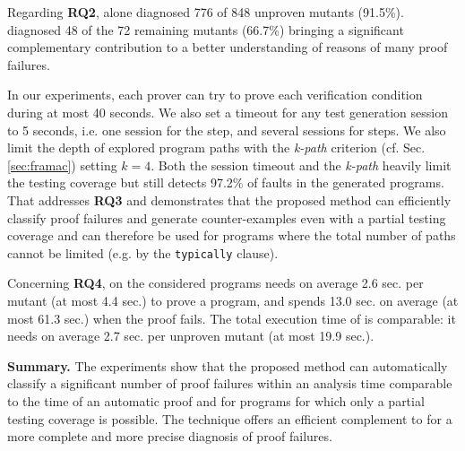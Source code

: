 Regarding \textbf{RQ2}, 
\NCD alone diagnosed 776 of 848 unproven mutants (91.5\%).
\CWD diagnosed 48 of the 72 remaining  mutants (66.7\%)
bringing a significant complementary contribution 
to a better understanding of reasons of many proof failures.

In our experiments,
each prover can try to prove each verification condition 
during at most 40 seconds.
We also set a timeout for any test generation session
to 5 seconds, i.e. one session for the \NCD step, and 
several sessions for \CWD steps.
We also limit the depth of explored program paths with the 
{\em k-path} criterion (cf. Sec. \ref{sec:framac})
setting $k = 4$.
Both the session timeout and the {\em k-path} heavily limit the testing coverage
but \stady still detects 97.2\% of faults in the generated programs.
That addresses \textbf{RQ3} and demonstrates that the proposed method can efficiently 
classify proof failures and generate counter-examples
even with a partial testing coverage and can therefore 
be used for programs where the 
total number of paths cannot be limited
(e.g. by the \lstinline{typically} clause).

Concerning \textbf{RQ4},
on the considered programs \Wp needs on average 2.6 sec. per mutant (at most 4.4 sec.) to
prove a program, and spends 13.0 sec. on average (at most 61.3 sec.) when the
proof fails.
The total execution time of \stady is comparable: it needs on average 2.7 sec.  per unproven mutant 
(at most 19.9 sec.).

\textbf{Summary.}
The experiments show that the proposed method can automatically classify a significant number
of proof failures within an analysis time comparable to the time of an automatic proof
and for programs for which only a partial testing coverage is possible.
The \CWD technique offers an efficient complement to \NCD for a more 
complete and more precise diagnosis of proof failures.

